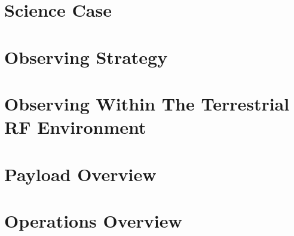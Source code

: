 \documentclass[preprint]{aastex631}
\begin{document}
\section{Science Case}
\label{sec:science}


\section{Observing Strategy}
\label{sec:observing}


\section{Observing Within The Terrestrial RF Environment}
\label{sec:rfenv}


\section{Payload Overview}
\label{sec:payload}


\section{Operations Overview}
\label{sec:operations}
%



{}



\end{document}
